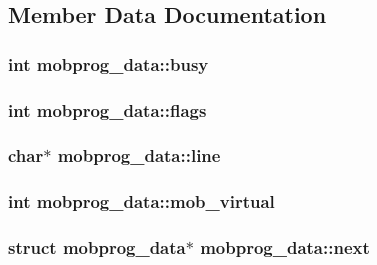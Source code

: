 \subsection{Member Data Documentation}
\hypertarget{structmobprog__data_aed5b719664a71a6802a9853d1a1c613c}{
\subsubsection[{busy}]{\setlength{\rightskip}{0pt plus 5cm}int mobprog\-\_\-data\-::busy}}\label{structmobprog__data_aed5b719664a71a6802a9853d1a1c613c}
\hypertarget{structmobprog__data_a8ff527d51c7f34baf992f26576c26e9b}{
\subsubsection[{flags}]{\setlength{\rightskip}{0pt plus 5cm}int mobprog\-\_\-data\-::flags}}\label{structmobprog__data_a8ff527d51c7f34baf992f26576c26e9b}
\hypertarget{structmobprog__data_a4d82709d17bf2744c6e14cb836d70a72}{
\subsubsection[{line}]{\setlength{\rightskip}{0pt plus 5cm}char$\ast$ mobprog\-\_\-data\-::line}}\label{structmobprog__data_a4d82709d17bf2744c6e14cb836d70a72}
\hypertarget{structmobprog__data_a49bbc3e41c8fdcd14c08729e1fc1b6fb}{
\subsubsection[{mob\-\_\-virtual}]{\setlength{\rightskip}{0pt plus 5cm}int mobprog\-\_\-data\-::mob\-\_\-virtual}}\label{structmobprog__data_a49bbc3e41c8fdcd14c08729e1fc1b6fb}
\hypertarget{structmobprog__data_aaa16ae74c608143c69ef7ecb080db55b}{
\subsubsection[{next}]{\setlength{\rightskip}{0pt plus 5cm}struct {\bf mobprog\-\_\-data}$\ast$ mobprog\-\_\-data\-::next}}\label{structmobprog__data_aaa16ae74c608143c69ef7ecb080db55b}
